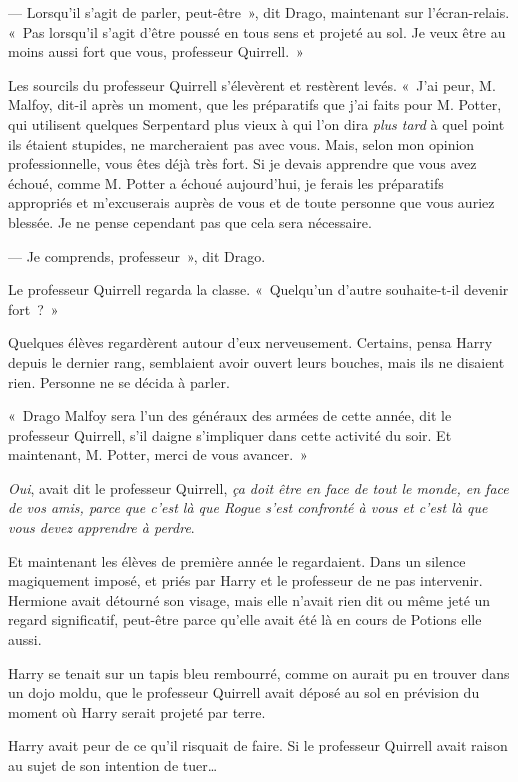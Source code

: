 --- Lorsqu'il s'agit de parler, peut-être~», dit Drago, maintenant sur l'écran-relais.
«~Pas lorsqu'il s'agit d'être poussé en tous sens et projeté au sol.
Je veux être au moins aussi fort que vous, professeur Quirrell.~»

Les sourcils du professeur Quirrell s'élevèrent et restèrent levés.
«~J'ai peur, M. Malfoy, dit-il après un moment, que les préparatifs que j'ai faits pour M. Potter, qui utilisent quelques Serpentard plus vieux à qui l'on dira \emph{plus tard} à quel point ils étaient stupides, ne marcheraient pas avec vous.
Mais, selon mon opinion professionnelle, vous êtes déjà très fort.
Si je devais apprendre que vous avez échoué, comme M. Potter a échoué aujourd'hui, je ferais les préparatifs appropriés et m'excuserais auprès de vous et de toute personne que vous auriez blessée.
Je ne pense cependant pas que cela sera nécessaire.

--- Je comprends, professeur~», dit Drago.

Le professeur Quirrell regarda la classe.
«~Quelqu'un d'autre souhaite-t-il devenir fort~?~»

Quelques élèves regardèrent autour d'eux nerveusement.
Certains, pensa Harry depuis le dernier rang, semblaient avoir ouvert leurs bouches, mais ils ne disaient rien.
Personne ne se décida à parler.

«~Drago Malfoy sera l'un des généraux des armées de cette année, dit le professeur Quirrell, s'il daigne s'impliquer dans cette activité du soir.
Et maintenant, M. Potter, merci de vous avancer.~»

\later

\emph{Oui}, avait dit le professeur Quirrell, \emph{ça doit être en face de tout le monde, en face de vos amis, parce que c'est là que Rogue s'est confronté à vous et c'est là que vous devez apprendre à perdre}.

Et maintenant les élèves de première année le regardaient.
Dans un silence magiquement imposé, et priés par Harry et le professeur de ne pas intervenir.
Hermione avait détourné son visage, mais elle n'avait rien dit ou même jeté un regard significatif, peut-être parce qu'elle avait été là en cours de Potions elle aussi.

Harry se tenait sur un tapis bleu rembourré, comme on aurait pu en trouver dans un dojo moldu, que le professeur Quirrell avait déposé au sol en prévision du moment où Harry serait projeté par terre.

Harry avait peur de ce qu'il risquait de faire.
Si le professeur Quirrell avait raison au sujet de son intention de tuer…

